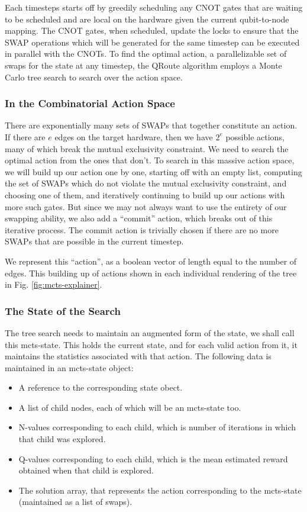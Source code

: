 \documentclass[%
 reprint,
 longbibliography,
 amsmath,amssymb,
 aps,
]{revtex4-2}
\begin{document}
Each timesteps starts off by greedily scheduling any CNOT gates that are waiting to be scheduled and are local on the hardware given the current qubit-to-node mapping. The CNOT gates, when scheduled, update the locks to ensure that the SWAP operations which will be generated for the same timestep can be executed in parallel with the CNOTs.
To find the optimal action, a parallelizable set of swaps for the state at any timestep, the QRoute algorithm employs a Monte Carlo tree search to search over the action space.

\subsubsection{\label{sec:method-mcts-actions}In the Combinatorial Action Space}

There are exponentially many sets of SWAPs that together constitute an action. If there are $e$ edges on the target hardware, then we have $2^e$ possible actions, many of which break the mutual exclusivity constraint. We need to search the optimal action from the ones that don't. To search in this massive action space, we will build up our action one by one, starting off with an empty list, computing the set of SWAPs which do not violate the mutual exclusivity constraint, and choosing one of them, and iteratively continuing to build up our actions with more such gates. But since we may not always want to use the entirety of our swapping ability, we also add a ``commit'' action, which breaks out of this iterative process. The commit action is trivially chosen if there are no more SWAPs that are possible in the current timestep.

We represent this ``action'', as a boolean vector of length equal to the number of edges. This building up of actions shown in each individual rendering of the tree in Fig. \ref{fig:mcts-explainer}.

\subsubsection{\label{sec:method-mcts-state}The State of the Search}

The tree search needs to maintain an augmented form of the state, we shall call this mcts-state. This holds the current state, and for each valid action from it, it maintains the statistics associated with that action. The following data is maintained in an mcts-state object:
\begin{itemize}
    \item A reference to the corresponding state obect.
    \item A list of child nodes, each of which will be an mcts-state too.
    \item N-values corresponding to each child, which is number of iterations in which that child was explored.
    \item Q-values corresponding to each child, which is the mean estimated reward obtained when that child is explored.
    \item The solution array, that represents the action corresponding to the mcts-state (maintained as a list of swaps). 
\end{itemize}
\end{document}
